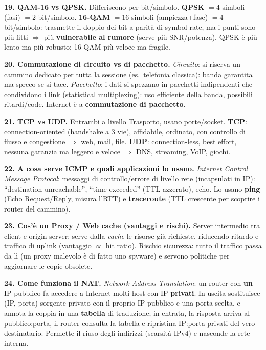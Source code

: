 \documentclass[11pt,a4paper]{report}
\begin{document}
\textbf{19. QAM-16 vs QPSK.} Differiscono per bit/simbolo. \textbf{QPSK} $=4$
simboli (fasi) $=2$ bit/simbolo. \textbf{16-QAM} $=16$ simboli (ampiezza+fase)
$=4$ bit/simbolo: trasmette il doppio dei bit a parità di symbol rate, ma i punti
sono più fitti $\Rightarrow$ più \textbf{vulnerabile al rumore} (serve più
SNR/potenza). QPSK è più lento ma più robusto; 16-QAM più veloce ma fragile.

\textbf{20. Commutazione di circuito vs di pacchetto.} \emph{Circuito}: si riserva
un cammino dedicato per tutta la sessione (es.\ telefonia classica): banda
garantita ma spreco se si tace. \emph{Pacchetto}: i dati si spezzano in pacchetti
indipendenti che condividono i link (statistical multiplexing): uso efficiente
della banda, possibili ritardi/code. Internet è a \textbf{commutazione di
pacchetto}.

\textbf{21. TCP vs UDP.} Entrambi a livello Trasporto, usano porte/socket.
\textbf{TCP}: connection-oriented (handshake a 3 vie), affidabile, ordinato, con
controllo di flusso e congestione $\Rightarrow$ web, mail, file. \textbf{UDP}:
connection-less, best effort, nessuna garanzia ma leggero e veloce $\Rightarrow$
DNS, streaming, VoIP, giochi.

\textbf{22. A cosa serve ICMP e quali applicazioni lo usano.} \emph{Internet
Control Message Protocol}: messaggi di controllo/errore di livello rete (incapsulati
in IP): ``destination unreachable'', ``time exceeded'' (TTL azzerato), echo. Lo
usano \textbf{ping} (Echo Request/Reply, misura l'RTT) e \textbf{traceroute}
(TTL crescente per scoprire i router del cammino).

\textbf{23. Cos'è un Proxy / Web cache (vantaggi e rischi).} Server intermedio tra
client e origin server: serve dalla \emph{cache} le risorse già richieste,
riducendo ritardo e traffico di uplink (vantaggio $\propto$ hit ratio). Rischio
sicurezza: tutto il traffico passa da lì (un proxy malevolo è di fatto uno
spyware) e servono politiche per aggiornare le copie obsolete.

\textbf{24. Come funziona il NAT.} \emph{Network Address Translation}: un router
con \textbf{un} IP pubblico fa accedere a Internet molti host con IP
\textbf{privati}. In uscita sostituisce (IP, porta) sorgente privato con il
proprio IP pubblico e una porta scelta, e annota la coppia in una \textbf{tabella}
di traduzione; in entrata, la risposta arriva al pubblico:porta, il router
consulta la tabella e ripristina IP:porta privati del vero destinatario. Permette
il riuso degli indirizzi (scarsità IPv4) e nasconde la rete interna.
\end{document}
